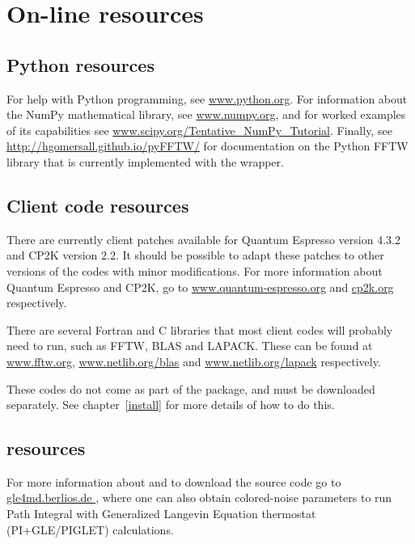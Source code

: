 \documentclass[11pt,english,fleqn]{report}
\begin{document}
\section{On-line resources}


\subsection{Python resources}

For help with Python programming, see \url{www.python.org}. For information
about the NumPy mathematical library, see \url{www.numpy.org}, and
for worked examples of its capabilities see \url{www.scipy.org/Tentative_NumPy_Tutorial}.
Finally, see \url{http://hgomersall.github.io/pyFFTW/} for documentation
on the Python FFTW library that is currently implemented with the
wrapper.


\subsection{Client code resources}

\label{librarywebsites}

There are currently client patches available for Quantum Espresso version
4.3.2 and CP2K version 2.2. It should be possible to adapt these patches
to other versions of the codes with minor modifications. For more
information about Quantum Espresso and CP2K, go to \url{www.quantum-espresso.org}
and \url{cp2k.org} respectively.

There are several Fortran and C libraries that most client codes will
probably need to run, such as FFTW, BLAS and LAPACK. These can be
found at \url{www.fftw.org}, \url{www.netlib.org/blas} and \url{www.netlib.org/lapack}
respectively.

These codes do not come as part of the \ipi package, and must be
downloaded separately. See chapter~\ref{install} for more details
of how to do this. 


\subsection{\ipi resources}

For more information about \ipi{} and to download the source code
go to \url{gle4md.berlios.de }, where one can also obtain colored-noise
parameters to run Path Integral with Generalized Langevin Equation
thermostat (PI+GLE/PIGLET) calculations.

\end{document}
